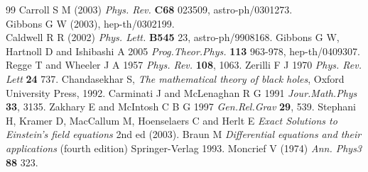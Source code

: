 \documentclass[12pt,aps,floats,showpacs,amssymb,tightenlines]{revtex4}
\begin{document}
\begin{thebibliography}{99}
 Carroll S M (2003) {\em Phys. Rev.} {\bf C68} 023509,
astro-ph/0301273.\\
Gibbons  G W (2003), hep-th/0302199.\\
Caldwell R R (2002) {\em Phys. Lett.} {\bf B545} 23,
astro-ph/9908168.
 Gibbons G W, Hartnoll D and  Ishibashi A 2005 {\em Prog.Theor.Phys.}
{\bf 113} 963-978, hep-th/0409307.
 Regge T and  Wheeler J A 1957 {\it Phys. Rev.} {\bf 108}, 1063.
  Zerilli F J 1970 {\it
Phys. Rev. Lett} {\bf 24} 737.
 Chandasekhar S, {\em The mathematical theory of
black holes}, Oxford University Press, 1992.
 Carminati J  and McLenaghan R G 1991  {\it Jour.Math.Phys} {\bf 33},
3135.
 Zakhary E and  McIntosh C B G 1997 {\em Gen.Rel.Grav} {\bf 29}, 539.
 Stephani H, Kramer D, MacCallum M, Hoenselaers C and Herlt E {\em
Exact Solutions to Einstein's field equations} 2nd ed (2003).
 Braun M {\em Differential equations and their
applications} (fourth edition) Springer-Verlag 1993.
 Moncrief V (1974) {\em Ann. Phys3} {\bf 88} 323.
\end{thebibliography}
\end{document}
